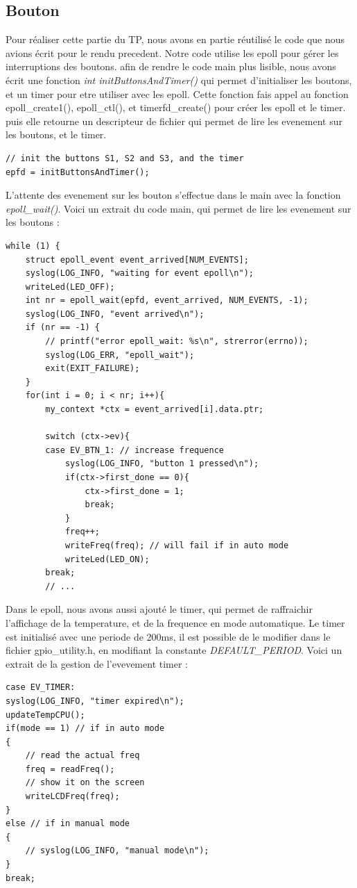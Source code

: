 \documentclass[
	a4paper, %
	10pt, %
]{CSUniSchoolLabReport}
\begin{document}
\subsection{Bouton}\label{Bouton}
Pour réaliser cette partie du TP, nous avons en partie réutilisé le code que nous avions écrit pour le rendu precedent.
Notre code utilise les epoll pour gérer les interruptions des boutons.
afin de rendre le code main plus lisible, nous avons écrit une fonction \textit{int initButtonsAndTimer()} qui permet d'initialiser les boutons, et un timer pour etre utiliser avec les epoll.
Cette fonction fais appel au fonction epoll\_create1(), epoll\_ctl(), et timerfd\_create() pour créer les epoll et le timer.
puis elle retourne un descripteur de fichier qui permet de lire les evenement sur les boutons, et le timer.
\begin{lstlisting}[style=CStyle]
// init the buttons S1, S2 and S3, and the timer
epfd = initButtonsAndTimer();
\end{lstlisting}
L'attente des evenement sur les bouton s'effectue dans le main avec la fonction \textit{epoll\_wait()}.
Voici un extrait du code main, qui permet de lire les evenement sur les boutons : \\
\begin{lstlisting}[style=CStyle]
while (1) {
	struct epoll_event event_arrived[NUM_EVENTS];
	syslog(LOG_INFO, "waiting for event epoll\n");
	writeLed(LED_OFF);
	int nr = epoll_wait(epfd, event_arrived, NUM_EVENTS, -1);
	syslog(LOG_INFO, "event arrived\n");
	if (nr == -1) {
		// printf("error epoll_wait: %s\n", strerror(errno));
		syslog(LOG_ERR, "epoll_wait");
		exit(EXIT_FAILURE);
	}
	for(int i = 0; i < nr; i++){
		my_context *ctx = event_arrived[i].data.ptr;

		switch (ctx->ev){
		case EV_BTN_1: // increase frequence
			syslog(LOG_INFO, "button 1 pressed\n");
			if(ctx->first_done == 0){
				ctx->first_done = 1;
				break;
			}
			freq++;
			writeFreq(freq); // will fail if in auto mode
			writeLed(LED_ON);
		break;
		// ...
\end{lstlisting}

Dans le epoll, nous avons aussi ajouté le timer, qui permet de raffraichir l'affichage de la temperature, et de la frequence en mode automatique.
Le timer est initialisé avec une periode de 200ms, il est possible de le modifier dans le fichier gpio\_utility.h, en modifiant la constante \textit{DEFAULT\_PERIOD}.
Voici un extrait de la gestion de l'evevement timer : \\
\begin{lstlisting}[style=CStyle]
case EV_TIMER:
syslog(LOG_INFO, "timer expired\n");
updateTempCPU();
if(mode == 1) // if in auto mode
{
	// read the actual freq
	freq = readFreq();
	// show it on the screen
	writeLCDFreq(freq); 
}
else // if in manual mode
{
	// syslog(LOG_INFO, "manual mode\n");
}
break;
\end{lstlisting}
\end{document}
